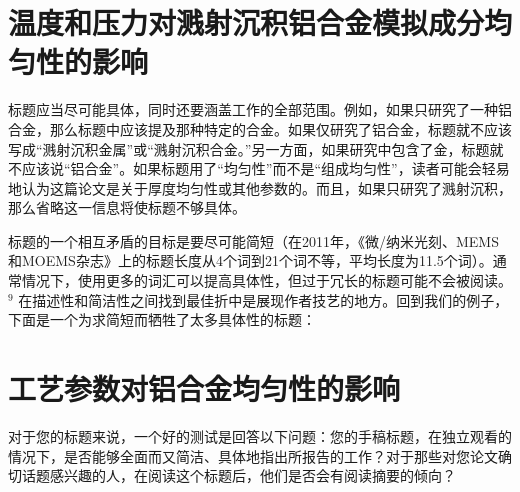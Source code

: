\section*{温度和压力对溅射沉积铝合金模拟成分均匀性的影响}
标题应当尽可能具体，同时还要涵盖工作的全部范围。例如，如果只研究了一种铝合金，那么标题中应该提及那种特定的合金。如果仅研究了铝合金，标题就不应该写成“溅射沉积金属”或“溅射沉积合金。”另一方面，如果研究中包含了金，标题就不应该说“铝合金”。如果标题用了“均匀性”而不是“组成均匀性”，读者可能会轻易地认为这篇论文是关于厚度均匀性或其他参数的。而且，如果只研究了溅射沉积，那么省略这一信息将使标题不够具体。

标题的一个相互矛盾的目标是要尽可能简短（在2011年，《微/纳米光刻、MEMS和MOEMS杂志》上的标题长度从4个词到21个词不等，平均长度为11.5个词）。通常情况下，使用更多的词汇可以提高具体性，但过于冗长的标题可能不会被阅读。${ }^{9}$ 在描述性和简洁性之间找到最佳折中是展现作者技艺的地方。回到我们的例子，下面是一个为求简短而牺牲了太多具体性的标题：

\section*{工艺参数对铝合金均匀性的影响}
对于您的标题来说，一个好的测试是回答以下问题：您的手稿标题，在独立观看的情况下，是否能够全面而又简洁、具体地指出所报告的工作？对于那些对您论文确切话题感兴趣的人，在阅读这个标题后，他们是否会有阅读摘要的倾向？


